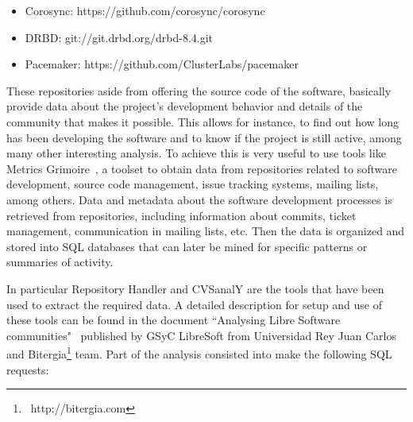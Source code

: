 \documentclass[a4paper, 12pt]{book}
\begin{document}
\begin{itemize}
	\item Corosync: https://github.com/corosync/corosync
	\item DRBD: git://git.drbd.org/drbd-8.4.git
	\item Pacemaker: https://github.com/ClusterLabs/pacemaker
\end{itemize}

\noindent These repositories aside from offering the source code of the software, basically provide data about the project's development behavior and details of the community that makes it possible. This allows for instance, to find out how long has been developing the software and to know if the project is still active, among many other interesting analysis. To achieve this is very useful to use tools like Metrics Grimoire~\cite{GSyC}, a toolset to obtain data from repositories related to software development, source code management, issue tracking systems, mailing lists, among others. Data and metadata about the software development processes is retrieved from repositories, including information about commits, ticket management, communication in mailing lists, etc. Then the data is organized and stored into SQL databases that can later be mined for specific patterns or summaries of activity. \bigskip

\noindent In particular Repository Handler and CVSanalY are the tools that have been used to extract the required data. A detailed description for setup and use of these tools can be found in the document ``Analysing Libre Software communities"~\cite{IandR} published by GSyC LibreSoft from Universidad Rey Juan Carlos and Bitergia\footnote{\ http://bitergia.com} team. Part of the analysis consisted into make the following SQL requests:
\end{document}
